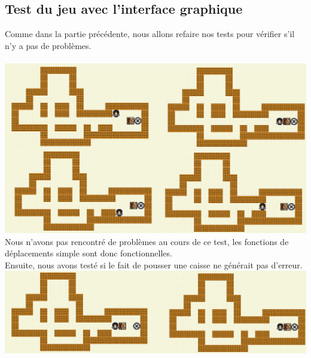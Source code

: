 \documentclass[a4paper,12pt]{article} %
\begin{document}
	\subsection{Test du jeu avec l'interface graphique}
	Comme dans la partie précédente, nous allons refaire nos tests pour vérifier s'il n'y a pas de problèmes.
	\paragraph{}
	\includegraphics[scale=0.5]{Tests-mouvements-GUI.png}
	Nous n'avons pas rencontré de problèmes au cours de ce test, les fonctions de déplacements simple sont donc fonctionnelles.\\
	
	Ensuite, nous avons testé si le fait de pousser une caisse ne générait pas d'erreur.\\
	\includegraphics[scale=0.5]{Tests-mouvements-caisse-GUI.png}
	\paragraph{}
	
	\paragraph{}
	
\end{document}
